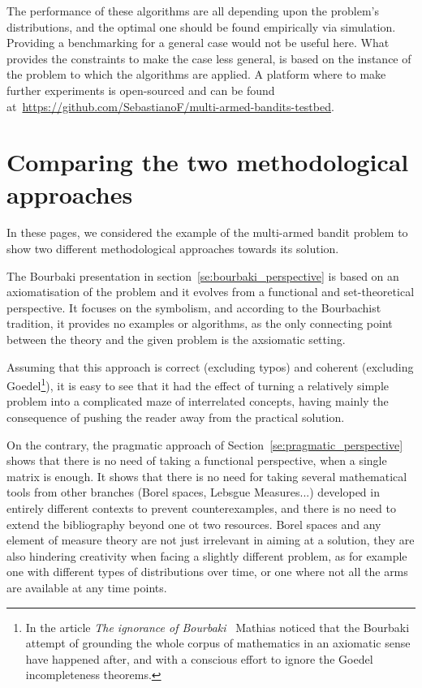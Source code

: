 \documentclass[]{scrartcl}
\theoremstyle{definition}
\begin{document}
The performance of these algorithms are all depending upon the problem's distributions, and the optimal one should be found empirically via simulation. Providing a benchmarking for a general case would not be useful here. What provides the constraints to make the case less general, is based on the instance of the problem to which the algorithms are applied. A platform where to make further experiments is open-sourced and can be found at~\href{https://github.com/SebastianoF/multi-armed-bandits-testbed}{https://github.com/SebastianoF/multi-armed-bandits-testbed}.


\section{Comparing the two methodological approaches}
\label{se:outro}

In these pages, we considered the example of the multi-armed bandit problem to show two different methodological approaches towards its solution.

The Bourbaki presentation in section~\ref{se:bourbaki_perspective} is based on an axiomatisation of the problem and it evolves from a functional and set-theoretical perspective. It focuses on the symbolism, and according to the Bourbachist tradition, it provides no examples or algorithms, as the only connecting point between the theory and the given problem is the axsiomatic setting.

Assuming that this approach is correct (excluding typos) and coherent (excluding Goedel\footnote{
    In the article \emph{The ignorance of Bourbaki}~\cite{mathias1992ignorance} Mathias noticed that the Bourbaki attempt of grounding the whole corpus of mathematics in an axiomatic sense have happened after, and with a conscious effort to ignore the Goedel incompleteness theorems.
}), it is easy to see that it had the effect of turning a relatively simple problem into a complicated maze of interrelated concepts, having mainly the consequence of pushing the reader away from the practical solution.

On the contrary, the pragmatic approach of Section~\ref{se:pragmatic_perspective} shows that there is no need of taking a functional perspective, when a single matrix is enough. It shows that there is no need for taking several mathematical tools from other branches (Borel spaces, Lebsgue Measures...) developed in entirely different contexts to prevent counterexamples, and there is no need to extend the bibliography beyond one ot two resources. Borel spaces and any element of measure theory are not just irrelevant in aiming at a solution, they are also hindering creativity when facing a slightly different problem, as for example one with different types of distributions over time, or one where not all the arms are available at any time points. 
\end{document}
